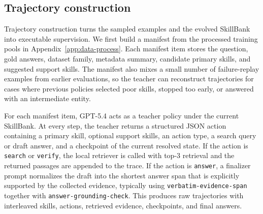 \documentclass{article}
\begin{document}
\subsection{Trajectory construction}
\label{app:trajectory-construction}

Trajectory construction turns the sampled examples and the evolved SkillBank into executable supervision. We first build a manifest from the processed training pools in Appendix~\ref{app:data-process}. Each manifest item stores the question, gold answers, dataset family, metadata summary, candidate primary skills, and suggested support skills. The manifest also mixes a small number of failure-replay examples from earlier evaluations, so the teacher can reconstruct trajectories for cases where previous policies selected poor skills, stopped too early, or answered with an intermediate entity.

For each manifest item, \textsc{GPT-5.4} acts as a teacher policy under the current SkillBank. At every step, the teacher returns a structured JSON action containing a primary skill, optional support skills, an action type, a search query or draft answer, and a checkpoint of the current resolved state. If the action is \texttt{search} or \texttt{verify}, the local retriever is called with top-\(3\) retrieval and the returned passages are appended to the trace. If the action is \texttt{answer}, a finalizer prompt normalizes the draft into the shortest answer span that is explicitly supported by the collected evidence, typically using \texttt{verbatim-evidence-span} together with \texttt{answer-grounding-check}. This produces raw trajectories with interleaved skills, actions, retrieved evidence, checkpoints, and final answers.
\end{document}

